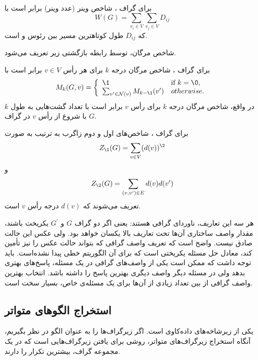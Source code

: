 \begin{definition}
برای گراف ، شاخص وینر (عدد وینر) برابر است با
\begin{equation*}
W(G) = \sum_{v_i\in V}\sum_{v_j\in V} D_{ij}
\end{equation*}
که $D_{ij}$ طول کوتاهترین مسیر بین رئوس \Vi و \Vj است.
\end{definition}

شاخص مرگان، توسط رابطه بازگشتی زیر تعریف می‌شود.
\begin{definition}
برای گراف ، شاخص مرگان درجه $k$ برای هر رأس $v \in V$ برابر است با
\begin{equation*}
M_k(G,v) = 
\left\{
	\begin{array}{ll}
		\1  & \mbox{if } k = \0, \\
		{\sum_{v^\prime\in \mN(v)}M_{k-\1}(v^\prime)} & otherwise.
	\end{array}
\right.
\end{equation*}
در واقع، شاخص مرگان درجه $k$ برای رأس $v$ برابر است با تعداد گشت‌هایی به طول $k$ با شروع از رأس $v$ در گراف $G$.
\end{definition}

\begin{definition}
برای گراف ، شاخص‌های اول و دوم زاگرب به ترتیب به صورت
\begin{equation*}
Z_\1(G) = \sum_{v\in V}(d(v))^\2
\end{equation*}
و
\begin{equation*}
Z_\2(G) = \sum_{(v,v^\prime)\in E}d(v)d(v^\prime)
\end{equation*}
تعریف می‌شوند که $d(v)$ درجه رأس $v$ است.
\end{definition}

هر سه این تعاریف، ناوردای گرافی هستند: یعنی اگر دو گراف $G$ و $G^\prime$ یکریخت باشند، مقدار واصف ساختاری آن‌ها تحت تعاریف بالا یکسان خواهد بود. ولی عکس این حالت صادق نیست. واضح است که تعریف واصف گرافی که بتواند حالت عکس را نیز تأمین کند، معادل حل مسئله یکریختی است که برای آن الگوریتم خطی پیدا نشده‌است.  باید توجه داشت که ممکن است یکی از واصف‌های گرافی در یک مسئله، پاسخ‌های بهتری بدهد ولی در مسئله دیگر واصف دیگری بهترین پاسخ را داشته باشد. انتخاب بهترین واصف گرافی از بین تعداد زیادی از آن‌ها برای یک مسئله‌ی خاص، بسیار سخت است.

\subsection{استخراج الگو‌های متواتر}
 یکی از زیرشاخه‌های داده‌کاوی است. اگر زیرگراف‌ها را به عنوان الگو در نظر بگیریم، آنگاه استخراج زیرگراف‌های متواتر، روشی برای یافتن زیرگراف‌هایی است که در یک مجموعه گراف، بیشترین تکرار را دارند.

